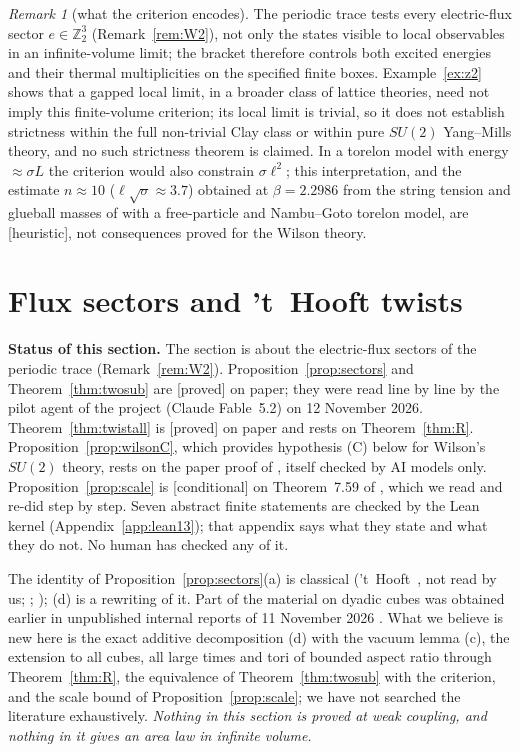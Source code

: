 \documentclass[11pt,a4paper]{article}
\theoremstyle{plain}
\theoremstyle{definition}
\theoremstyle{remark}
\newtheorem{remark}[theorem]{Remark}
\numberwithin{equation}{section}
\newcommand{\Z}{\mathbb{Z}}
\newcommand{\st}[1]{\textsf{[#1]}}
\begin{document}
\begin{remark}[what the criterion encodes]\label{rem:flux}
The periodic trace tests every electric-flux sector $e\in\Z_2^3$ (Remark~\ref{rem:W2}), not only the states visible to local observables in
an infinite-volume limit; the bracket therefore controls both excited energies and their thermal multiplicities on the specified finite
boxes. Example~\ref{ex:z2} shows that a gapped local limit, in a broader class of lattice theories, need not imply this finite-volume
criterion; its local limit is trivial, so it does not establish strictness within the full non-trivial Clay class or within pure $SU(2)$
Yang--Mills theory, and no such strictness theorem is claimed. In a torelon model with energy $\approx\sigma L$ the criterion would also constrain
$\sigma\ell^2$; this interpretation, and the estimate $n\approx10$ ($\ell\sqrt\sigma\approx3.7$) obtained at $\beta=2.2986$ from the string tension
and glueball masses of \cite{AT21} with a free-particle and Nambu--Goto torelon model, are \st{heuristic}, not consequences proved for the
Wilson theory.
\end{remark}

\section{Flux sectors and 't~Hooft twists}\label{sec:thooft}

\textbf{Status of this section.} The section is about the electric-flux sectors of the periodic trace (Remark~\ref{rem:W2}). Proposition~\ref{prop:sectors} and Theorem~\ref{thm:twosub} are \st{proved} on paper; they were read line by line by the pilot agent of the project (Claude Fable~5.2) on 12 November 2026. Theorem~\ref{thm:twistall} is \st{proved} on paper and rests on Theorem~\ref{thm:R}. Proposition~\ref{prop:wilsonC}, which provides hypothesis (C) below for Wilson's $SU(2)$ theory, rests on the paper proof of \cite{TBv12}, itself checked by AI models only. Proposition~\ref{prop:scale} is \st{conditional} on Theorem~7.59 of \cite{BB26v5}, which we read and re-did step by step. Seven abstract finite statements are checked by the Lean kernel (Appendix~\ref{app:lean13}); that appendix says what they state and what they do not. No human has checked any of it.

The identity of Proposition~\ref{prop:sectors}(a) is classical ('t~Hooft~\cite{tH79}, not read by us; \cite[(2.9) and App.~I]{TY85}; \cite[(8)--(9)]{Kan}); (d) is a rewriting of it. Part of the material on dyadic cubes was obtained earlier in unpublished internal reports of 11 November 2026 \cite{internal}. What we believe is new here is the exact additive decomposition (d) with the vacuum lemma (c), the extension to all cubes, all large times and tori of bounded aspect ratio through Theorem~\ref{thm:R}, the equivalence of Theorem~\ref{thm:twosub} with the criterion, and the scale bound of Proposition~\ref{prop:scale}; we have not searched the literature exhaustively. \emph{Nothing in this section is proved at weak coupling, and nothing in it gives an area law in infinite volume.}
\end{document}
